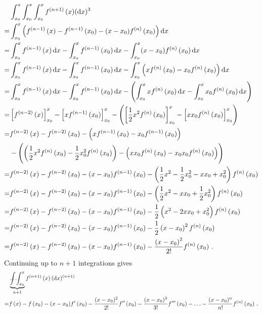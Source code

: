 \begin{align*}
  &\int_{x_0}^x\int_{x_0}^x\int_{x_0}^x{f^{(n+1)}\del{ x }} (\dif x)^3 \\
  = &\int_{x_0}^x{\del{ f^{(n-1)}\del{ x } - f^{(n-1)}\del{ x_0 } - (x - x_0) f^{(n)}\del{ x_0 } }}\dif x \\
  = &\int_{x_0}^x{f^{(n-1)}\del{ x }}\dif x - \int_{x_0}^x{f^{(n-1)}\del{ x_0 }}\dif x - \int_{x_0}^x(x - x_0){f^{(n)}\del{ x_0 }}\dif x \\
  = &\int_{x_0}^x{f^{(n-1)}\del{ x }}\dif x - \int_{x_0}^x{f^{(n-1)}\del{ x_0 }}\dif x - \int_{x_0}^x\del{x f^{(n)}\del{ x_0 } - x_0 f^{(n)}\del{ x_0 }}\dif x \\
  = &\int_{x_0}^x{f^{(n-1)}\del{ x }}\dif x - \int_{x_0}^x{f^{(n-1)}\del{ x_0 }}\dif x - \del{ \int_{x_0}^x{x f^{(n)}\del{ x_0 }}\dif x - \int_{x_0}^x{x_0 f^{(n)}\del{ x_0 }}\dif x } \\
  = &\sbr{ f^{(n-2)}\del{ x } }_{x_0}^x -\sbr{ x f^{(n-1)}\del{ x_0 } }_{x_0}^x - \del{ \sbr{ \frac{1}{2}x^2f^{(n)}\del{ x_0 } }_{x_0}^x - \sbr{ xx_0f^{(n)}\del{ x_0 } }_{x_0}^x } \\
  = &f^{(n-2)}\del{ x }
    - f^{(n-2)}\del{ x_0 }
    - \del{ x f^{(n-1)}\del{ x_0 }
    - x_0 f^{(n-1)}\del{ x_0 } } \\
  &- \del{ \del{ \frac{1}{2} x^2 f^{(n)}\del{ x_0 }
    - \frac{1}{2} x_0^2 f^{(n)}\del{ x_0 } }
    - \del{ x x_0 f^{(n)}\del{ x_0 }
    - x_0 x_0 f^{(n)}\del{ x_0 } } } \\
  = &f^{(n-2)}\del{ x }
    - f^{(n-2)}\del{ x_0 }
    - (x - x_0) f^{(n-1)}\del{ x_0 } - \del{ \frac{1}{2} x^2 - \frac{1}{2} x_0^2 - x x_0 + x_0^2 } f^{(n)}\del{ x_0 } \\
  = &f^{(n-2)}\del{ x }
    - f^{(n-2)}\del{ x_0 }
    - (x - x_0) f^{(n-1)}\del{ x_0 } - \del{ \frac{1}{2} x^2 - x x_0 + \frac{1}{2} x_0^2 } f^{(n)}\del{ x_0 } \\
  = &f^{(n-2)}\del{ x }
    - f^{(n-2)}\del{ x_0 }
    - (x - x_0) f^{(n-1)}\del{ x_0 } - \frac{1}{2} \del{ x^2 - 2 x x_0 + x_0^2 } f^{(n)}\del{ x_0 } \\
  = &f^{(n-2)}\del{ x }
    - f^{(n-2)}\del{ x_0 }
    - (x - x_0) f^{(n-1)}\del{ x_0 } - \frac{1}{2} \del{ x - x_0 }^2 f^{(n)}\del{ x_0 } \\
  = &f^{(n-2)}\del{ x }
    - f^{(n-2)}\del{ x_0 }
    - (x - x_0) f^{(n-1)}\del{ x_0 } - \frac{\del{ x - x_0 }^2}{2 !}  f^{(n)}\del{ x_0 } \, .
\end{align*}
Continuing up to $n + 1$ integrations gives
\begin{align*}
  &\underbrace{\int \hspace{-4mm} \hdots \hspace{-1mm} \int_{x_0}^x}_{n+1}{f^{(n+1)}\del{ x }(\dif x)^{(n+1)}} \\
  = &f\del{ x } - f\del{ x_0 } - (x - x_0) f'\del{ x_0 } - \frac{(x - x_0)^2}{2!} f''\del{ x_0 } - \frac{(x - x_0)^3}{3!} f'''\del{ x_0 } - \mathellipsis - \frac{(x - x_0)^n}{n!} f^{(n)}\del{ x_0 } \, .
\end{align*}
